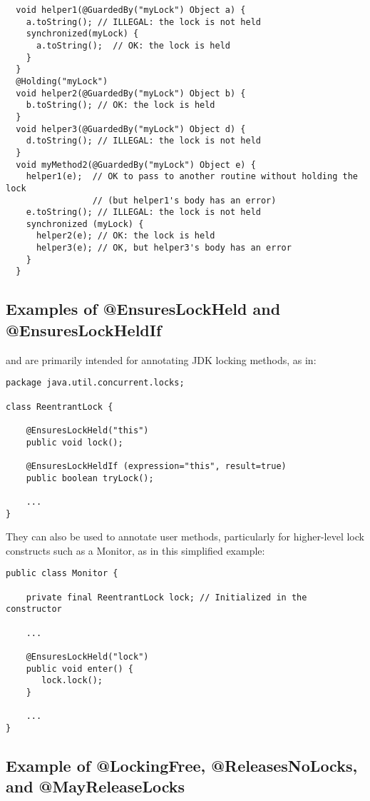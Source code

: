 \begin{Verbatim}
  void helper1(@GuardedBy("myLock") Object a) {
    a.toString(); // ILLEGAL: the lock is not held
    synchronized(myLock) {
      a.toString();  // OK: the lock is held
    }
  }
  @Holding("myLock")
  void helper2(@GuardedBy("myLock") Object b) {
    b.toString(); // OK: the lock is held
  }
  void helper3(@GuardedBy("myLock") Object d) {
    d.toString(); // ILLEGAL: the lock is not held
  }
  void myMethod2(@GuardedBy("myLock") Object e) {
    helper1(e);  // OK to pass to another routine without holding the lock
                 // (but helper1's body has an error)
    e.toString(); // ILLEGAL: the lock is not held
    synchronized (myLock) {
      helper2(e); // OK: the lock is held
      helper3(e); // OK, but helper3's body has an error
    }
  }
\end{Verbatim}


\subsection{Examples of @EnsuresLockHeld and @EnsuresLockHeldIf\label{ensureslockheld-examples}}

 and  are primarily intended
for annotating JDK locking methods, as in:

\begin{Verbatim}
package java.util.concurrent.locks;

class ReentrantLock {

    @EnsuresLockHeld("this")
    public void lock();

    @EnsuresLockHeldIf (expression="this", result=true)
    public boolean tryLock();

    ...
}
\end{Verbatim}

They can also be used to annotate user methods, particularly for
higher-level lock constructs such as a Monitor, as in this simplified example:

\begin{Verbatim}
public class Monitor {

    private final ReentrantLock lock; // Initialized in the constructor

    ...

    @EnsuresLockHeld("lock")
    public void enter() {
       lock.lock();
    }

    ...
}
\end{Verbatim}

\subsection{Example of @LockingFree, @ReleasesNoLocks, and @MayReleaseLocks\label{lock-lockingfree-example}}

